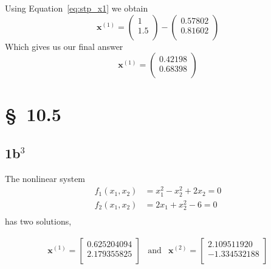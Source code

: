 \documentclass[12pt]{article}
\begin{document}
Using Equation~\ref{eq:stp_x1} we obtain
\begin{equation*}
  \label{eq:stp_x1_numeric}
  \mathbf{x}^{(1)}=
  \begin{pmatrix}
    1 \\
    1.5 \\
  \end{pmatrix} - 
  \begin{pmatrix}
    0.57802 \\
    0.81602 \\
  \end{pmatrix}  
\end{equation*}
Which gives us our final answer
\begin{equation*}
\label{eq:stp_x1_answer}
\boxed{\mathbf{x}^{(1)}=
  \begin{pmatrix}
    0.42198 \\
    0.68398 \\
  \end{pmatrix}}
\end{equation*}

\section{\S~10.5}
\subsection{1b$^3$}
The nonlinear system
\begin{align*}
  f_1(x_1,x_2)&=x_1^2-x_2^2+2x_2 =0 \\
  f_2(x_1,x_2)&=2x_1+x_2^2-6 =0 \\
\end{align*}
has two solutions,

\begin{equation*}
  \begin{array}{ccc}
    \mathbf{x}^{(1)}=
    \begin{bmatrix}
      0.625204094 \\
      2.179355825 \\
    \end{bmatrix}
    &
    \mathrm{and}
    &
    \mathbf{x}^{(2)}=
    \begin{bmatrix}
      2.109511920 \\
      −1.334532188 \\
    \end{bmatrix}
  \end{array}
\end{equation*}
\end{document}
